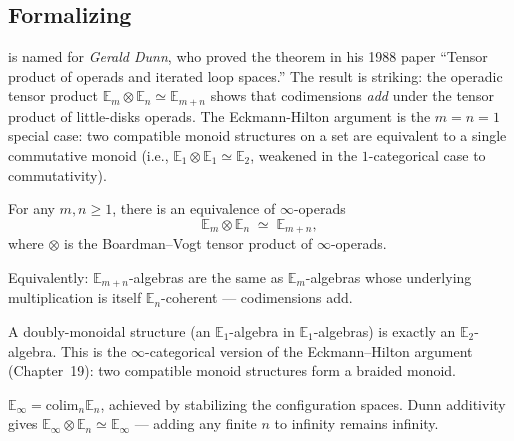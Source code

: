 \subsection{Formalizing}

\begin{nameorigin}
 is named for \emph{Gerald Dunn}, who proved
the theorem in his 1988 paper ``Tensor product of operads and iterated
loop spaces.'' The result is striking: the operadic tensor product
$\mathbb{E}_m \otimes \mathbb{E}_n \simeq \mathbb{E}_{m+n}$ shows that
codimensions \emph{add} under the tensor product of little-disks
operads. The Eckmann-Hilton argument is the $m = n = 1$ special case:
two compatible monoid structures on a set are equivalent to a single
commutative monoid (i.e., $\mathbb{E}_1 \otimes \mathbb{E}_1 \simeq
\mathbb{E}_2$, weakened in the $1$-categorical case to commutativity).
\end{nameorigin}

\begin{theorem}
\label{thm:dunn}
For any $m, n \geq 1$, there is an equivalence of $\infty$-operads
\begin{equation*}
  \mathbb{E}_m \otimes \mathbb{E}_n \;\simeq\; \mathbb{E}_{m+n},
\end{equation*}
where $\otimes$ is the Boardman--Vogt tensor product of $\infty$-operads.

Equivalently: $\mathbb{E}_{m+n}$-algebras are the same as
$\mathbb{E}_m$-algebras whose underlying multiplication is itself
$\mathbb{E}_n$-coherent — codimensions add.
\end{theorem}

\begin{example_thm}[$\mathbb{E}_2 = \mathbb{E}_1 \otimes \mathbb{E}_1$]
\label{ex:e2-e1-tensor}
A doubly-monoidal structure (an $\mathbb{E}_1$-algebra in
$\mathbb{E}_1$-algebras) is exactly an $\mathbb{E}_2$-algebra. This is the
$\infty$-categorical version of the Eckmann--Hilton argument (Chapter~19):
two compatible monoid structures form a braided monoid.
\end{example_thm}

\begin{example_thm}
\label{ex:e-infty-limit}
$\mathbb{E}_\infty = \mathrm{colim}_n \mathbb{E}_n$, achieved by stabilizing
the configuration spaces. Dunn additivity gives $\mathbb{E}_\infty \otimes
\mathbb{E}_n \simeq \mathbb{E}_\infty$ — adding any finite $n$ to infinity
remains infinity.
\end{example_thm}


